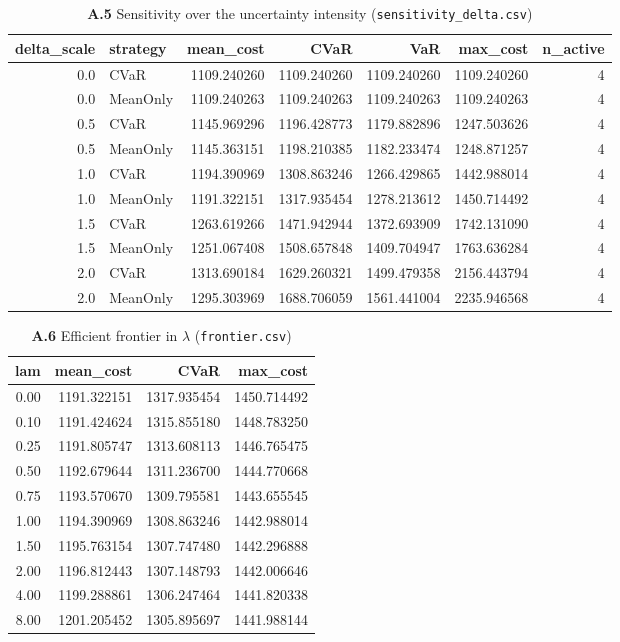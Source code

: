 \documentclass[11pt,a4paper]{article}
\theoremstyle{remark}
\newcommand{\code}[1]{\texttt{#1}}
\begin{document}
\begin{landscape}
\begin{table}[H]
\centering
\caption*{\textbf{A.5} Sensitivity over the uncertainty intensity
(\code{sensitivity\_delta.csv})}
\scriptsize
\begin{tabular}{@{}rlrrrrr@{}}
\toprule
delta\_scale & strategy & mean\_cost & CVaR & VaR & max\_cost & n\_active \\
\midrule
0.0 & CVaR & 1109.240260 & 1109.240260 & 1109.240260 & 1109.240260 & 4 \\
0.0 & MeanOnly & 1109.240263 & 1109.240263 & 1109.240263 & 1109.240263 & 4 \\
0.5 & CVaR & 1145.969296 & 1196.428773 & 1179.882896 & 1247.503626 & 4 \\
0.5 & MeanOnly & 1145.363151 & 1198.210385 & 1182.233474 & 1248.871257 & 4 \\
1.0 & CVaR & 1194.390969 & 1308.863246 & 1266.429865 & 1442.988014 & 4 \\
1.0 & MeanOnly & 1191.322151 & 1317.935454 & 1278.213612 & 1450.714492 & 4 \\
1.5 & CVaR & 1263.619266 & 1471.942944 & 1372.693909 & 1742.131090 & 4 \\
1.5 & MeanOnly & 1251.067408 & 1508.657848 & 1409.704947 & 1763.636284 & 4 \\
2.0 & CVaR & 1313.690184 & 1629.260321 & 1499.479358 & 2156.443794 & 4 \\
2.0 & MeanOnly & 1295.303969 & 1688.706059 & 1561.441004 & 2235.946568 & 4 \\
\bottomrule
\end{tabular}
\end{table}

\begin{table}[H]
\centering
\caption*{\textbf{A.6} Efficient frontier in $\lambda$ (\code{frontier.csv})}
\scriptsize
\begin{tabular}{@{}rrrr@{}}
\toprule
lam & mean\_cost & CVaR & max\_cost \\
\midrule
0.00 & 1191.322151 & 1317.935454 & 1450.714492 \\
0.10 & 1191.424624 & 1315.855180 & 1448.783250 \\
0.25 & 1191.805747 & 1313.608113 & 1446.765475 \\
0.50 & 1192.679644 & 1311.236700 & 1444.770668 \\
0.75 & 1193.570670 & 1309.795581 & 1443.655545 \\
1.00 & 1194.390969 & 1308.863246 & 1442.988014 \\
1.50 & 1195.763154 & 1307.747480 & 1442.296888 \\
2.00 & 1196.812443 & 1307.148793 & 1442.006646 \\
4.00 & 1199.288861 & 1306.247464 & 1441.820338 \\
8.00 & 1201.205452 & 1305.895697 & 1441.988144 \\
\bottomrule
\end{tabular}
\end{table}


\end{landscape}
\end{document}
